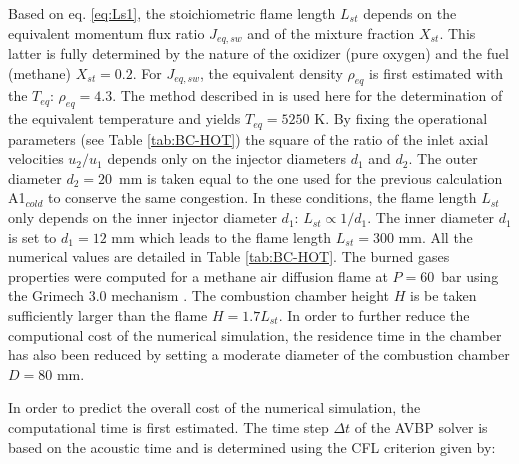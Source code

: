 \documentclass[twocolumn,10pt]{asme2e}
\begin{document}
Based on eq. \ref{eq:Ls1}, the stoichiometric flame length $L_{st}$ depends on the equivalent momentum flux ratio $J_{eq,sw}$ and of the mixture fraction $X_{st}$. This latter is fully determined by the nature of the oxidizer (pure oxygen) and the fuel (methane) $X_{st}=0.2$. For $J_{eq,sw}$, the equivalent density $\rho_{eq}$ is first estimated with the $T_{eq}$: $\rho_{eq}=4.3$. The method described in \cite{tacina2000effects,dahm2005effects} is used here for the determination of the equivalent temperature and yields $T_{eq}= 5250$ K. By fixing the operational parameters (see Table \ref{tab:BC-HOT}) the square of the ratio of the inlet axial velocities $u_2/u_1$ depends only on the injector diameters $d_1$ and $d_2$. The outer diameter $d_2=20$~mm is taken equal to the one used for the previous calculation A1$_{cold}$ to conserve the same congestion. In these conditions, the flame length $L_{st}$ only depends on the inner injector diameter $d_1$: $L_{st} \propto 1/d_1$. The inner diameter $d_1$ is set to $d_1=12$ mm which leads to the flame length $L_{st}=300$ mm. All the numerical values are detailed in Table \ref{tab:BC-HOT}. The burned gases properties were computed for a methane air diffusion flame at $P=60$~bar using the Grimech 3.0 mechanism \cite{cordiersimulation}. The combustion chamber height $H$ is be taken sufficiently larger than the flame $H = 1.7 L_{st}$. In order to further reduce the computional cost of the numerical simulation, the residence time in the chamber has also been reduced by setting a moderate diameter of the combustion chamber $D= 80$ mm. 

In order to predict the overall cost of the numerical simulation, the computational time is first estimated. The time step $\Delta t$ of the AVBP solver is based on the acoustic time and is determined using the CFL criterion given by:
\end{document}
